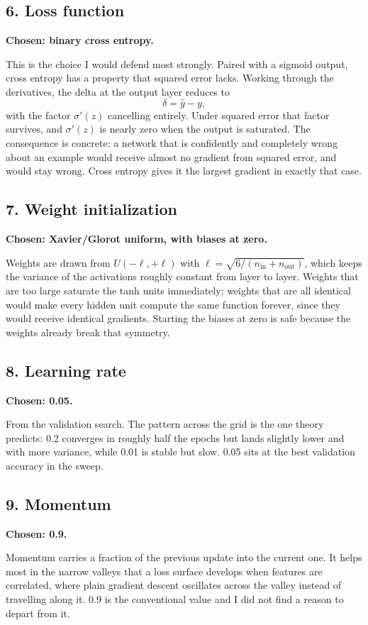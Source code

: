 \documentclass[11pt]{article}
\begin{document}
\subsection*{6. Loss function}
\textbf{Chosen: binary cross entropy.}

This is the choice I would defend most strongly. Paired with a sigmoid output,
cross entropy has a property that squared error lacks. Working through the
derivatives, the delta at the output layer reduces to
\[
\delta = \hat{y} - y,
\]
with the factor $\sigma'(z)$ cancelling entirely. Under squared error that
factor survives, and $\sigma'(z)$ is nearly zero when the output is saturated.
The consequence is concrete: a network that is confidently and completely wrong
about an example would receive almost no gradient from squared error, and would
stay wrong. Cross entropy gives it the largest gradient in exactly that case.

\subsection*{7. Weight initialization}
\textbf{Chosen: Xavier/Glorot uniform, with biases at zero.}

Weights are drawn from $U(-\ell, +\ell)$ with $\ell = \sqrt{6/(n_{\text{in}} +
n_{\text{out}})}$, which keeps the variance of the activations roughly constant
from layer to layer. Weights that are too large saturate the tanh units
immediately; weights that are all identical would make every hidden unit compute
the same function forever, since they would receive identical gradients.
Starting the biases at zero is safe because the weights already break that
symmetry.

\subsection*{8. Learning rate}
\textbf{Chosen: 0.05.}

From the validation search. The pattern across the grid is the one theory
predicts: 0.2 converges in roughly half the epochs but lands slightly lower and
with more variance, while 0.01 is stable but slow. 0.05 sits at the best
validation accuracy in the sweep.

\subsection*{9. Momentum}
\textbf{Chosen: 0.9.}

Momentum carries a fraction of the previous update into the current one. It
helps most in the narrow valleys that a loss surface develops when features are
correlated, where plain gradient descent oscillates across the valley instead of
travelling along it. 0.9 is the conventional value and I did not find a reason
to depart from it.
\end{document}
